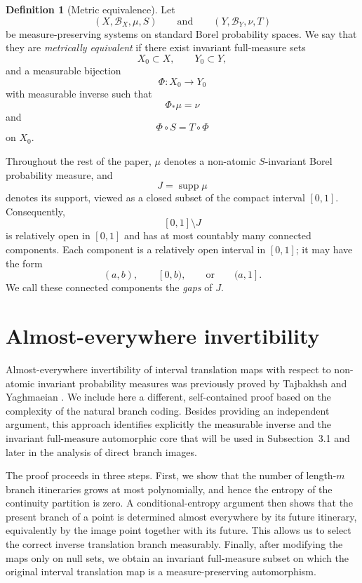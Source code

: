 \documentclass[11pt]{amsart}
\theoremstyle{plain}
\theoremstyle{definition}
\newtheorem{definition}[theorem]{Definition}
\theoremstyle{remark}
\newcommand{\borel}{\mathcal B}
\begin{document}
\begin{definition}[Metric equivalence]
	Let
	\[
	(X,\borel_X,\mu,S)
	\qquad\text{and}\qquad
	(Y,\borel_Y,\nu,T)
	\]
	be measure-preserving systems on standard Borel probability spaces. We say
	that they are \emph{metrically equivalent} if there exist invariant
	full-measure sets
	\[
	X_0\subset X,
	\qquad
	Y_0\subset Y,
	\]
	and a measurable bijection
	\[
	\Phi:X_0\longrightarrow Y_0
	\]
	with measurable inverse such that
	\[
	\Phi_*\mu=\nu
	\]
	and
	\[
	\Phi\circ S=T\circ\Phi
	\]
	on \(X_0\).
\end{definition}

Throughout the rest of the paper, \(\mu\) denotes a non-atomic
\(S\)-invariant Borel probability measure, and
\[
J=\operatorname{supp}\mu
\]
denotes its support, viewed as a closed subset of the compact interval
\([0,1]\). Consequently,
\[
[0,1]\setminus J
\]
is relatively open in \([0,1]\) and has at most countably many connected
components. Each component is a relatively open interval in \([0,1]\); it
may have the form
\[
(a,b),\qquad [0,b),\qquad\text{or}\qquad(a,1].
\]
We call these connected components the \emph{gaps} of \(J\).
\section{Almost-everywhere invertibility}\label{sec:ae-invertibility}

Almost-everywhere invertibility of interval translation maps with respect to non-atomic
invariant probability measures was previously proved by Tajbakhsh and Yaghmaeian
\cite{TajbakhshYaghmaeian2025}. We include here a different, self-contained proof based on
the complexity of the natural branch coding. Besides providing an independent argument, this
approach identifies explicitly the measurable inverse and the invariant full-measure
automorphic core that will be used in Subsection~3.1 and later in the analysis of direct branch
images.

The proof proceeds in three steps. First, we show that the number of length-$m$ branch
itineraries grows at most polynomially, and hence the entropy of the continuity partition is
zero. A conditional-entropy argument then shows that the present branch of a point is
determined almost everywhere by its future itinerary, equivalently by the image point together
with its future. This allows us to select the correct inverse translation branch measurably.
Finally, after modifying the maps only on null sets, we obtain an invariant full-measure subset
on which the original interval translation map is a measure-preserving automorphism.
\end{document}
